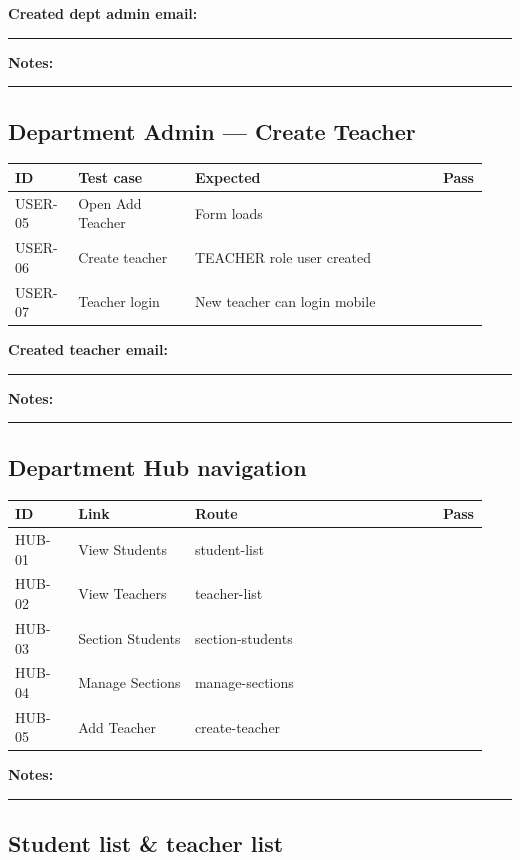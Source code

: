 \documentclass[11pt,a4paper,oneside]{article}
\newcommand{\chk}{\fbox{\rule{0pt}{1.05ex}\rule{1.05ex}{0pt}}}
\newcommand{\fillin}[1][3.5cm]{\rule{#1}{0.4pt}}
\newcommand{\fillinlong}{\rule{0.72\textwidth}{0.4pt}}
\newcommand{\notesblock}{\par\smallskip\noindent\textbf{Notes:}\ \fillinlong\par\smallskip}
\newcommand{\fieldline}[1]{\par\smallskip\noindent\textbf{#1}\ \fillin\par}
\newcommand{\tcheadfour}{%
  \toprule
  \textbf{ID} & \textbf{Test case} & \textbf{Expected} & \textbf{Pass} \\
  \midrule
}
\begin{document}
\fieldline{Created dept admin email:}
\notesblock

\subsection{Department Admin — Create Teacher}

\small
\begin{tabular}{@{}>{\raggedright\arraybackslash}p{0.13\linewidth} >{\raggedright\arraybackslash}p{0.24\linewidth} >{\raggedright\arraybackslash}p{0.51\linewidth} >{\centering\arraybackslash}p{0.06\linewidth}@{}}
  \tcheadfour
  USER-05 & Open Add Teacher  & Form loads                    & \chk \\
  USER-06 & Create teacher    & TEACHER role user created     & \chk \\
  USER-07 & Teacher login     & New teacher can login mobile  & \chk \\
  \bottomrule
\end{tabular}
\normalsize

\fieldline{Created teacher email:}
\notesblock

\subsection{Department Hub navigation}

\small
\begin{tabular}{@{}>{\raggedright\arraybackslash}p{0.13\linewidth} >{\raggedright\arraybackslash}p{0.24\linewidth} >{\raggedright\arraybackslash}p{0.51\linewidth} >{\centering\arraybackslash}p{0.06\linewidth}@{}}
  \toprule
  \textbf{ID} & \textbf{Link} & \textbf{Route} & \textbf{Pass} \\
  \midrule
  HUB-01 & View Students    & student-list       & \chk \\
  HUB-02 & View Teachers    & teacher-list       & \chk \\
  HUB-03 & Section Students & section-students   & \chk \\
  HUB-04 & Manage Sections  & manage-sections    & \chk \\
  HUB-05 & Add Teacher      & create-teacher     & \chk \\
  \bottomrule
\end{tabular}
\normalsize

\notesblock

\subsection{Student list \& teacher list}
\end{document}
